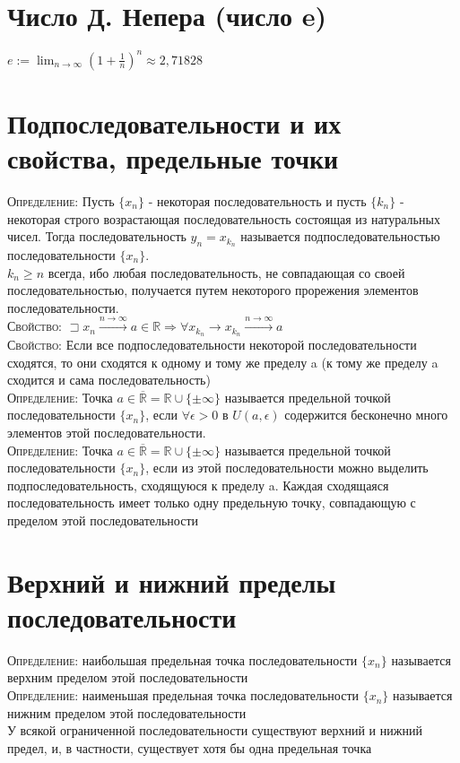 \documentclass[14pt]{article}
\begin{document}
    \section{Число Д. Непера (число e)}
        $e:=\lim_{n\rightarrow \infty} (1 + \frac{1}{n})^n \approx 2,71828$

    \section{Подпоследовательности и их свойства, предельные точки}
        \textsc{Определение:} Пусть $\{x_n\}$ - некоторая последовательность и пусть $\{k_n\}$ - некоторая строго возрастающая последовательность состоящая из натуральных чисел. Тогда последовательность $y_n = x_{k_n}$ называется подпоследовательностью последовательности $\{x_n\}$. \\
        $k_n \geqslant n$ всегда, ибо любая последовательность, не совпадающая со своей последовательностью, получается путем некоторого прорежения элементов последовательности.  \\
        \textsc{Свойство:} $\sqsupset  x_n \xrightarrow{n \rightarrow \infty} a \in \mathbb{R} \Rightarrow \forall x_{k_n} \rightarrow x_{k_n} \xrightarrow{n \rightarrow \infty} a$ \\
        \textsc{Свойство:} Если все подпоследовательности некоторой последовательности сходятся, то они сходятся к одному и тому же пределу a (к тому же пределу a сходится и сама последовательность) \\
        \textsc{Определение:} Точка $a \in \overline{\mathbb{R}} = \mathbb{R} \cup \{\pm \infty \}$ называется предельной точкой последовательности $\{x_n\}$, если $\forall \epsilon > 0 $ в $ U(a, \epsilon)$ содержится бесконечно много элементов этой последовательности. \\ 
        \textsc{Определение:} Точка $a \in \overline{\mathbb{R}} = \mathbb{R} \cup \{\pm \infty \}$ называется предельной точкой последовательности $\{x_n\}$, если из этой последовательности можно выделить подпоследовательность, сходящуюся к пределу a.
        Каждая сходящаяся последовательность имеет только одну предельную точку, совпадающую с пределом этой последовательности

    \section{Верхний и нижний пределы последовательности}
        \textsc{Определение:} наибольшая предельная точка последовательности $\{x_n\}$ называется верхним пределом этой последовательности \\
        \textsc{Определение:} наименьшая предельная точка последовательности $\{x_n\}$ называется нижним пределом этой последовательности \\
        У всякой ограниченной последовательности существуют верхний и нижний предел, и, в частности, существует хотя бы одна предельная точка
\end{document}
